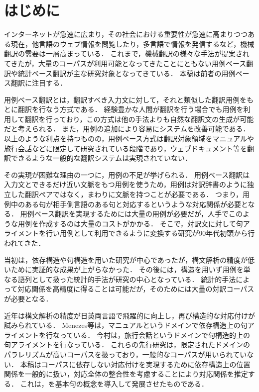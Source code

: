 \section{はじめに}
インターネットが急速に広まり，その社会における重要性が急速に高まりつつある現在，他言語のウェブ情報を閲覧したり，多言語で情報を発信するなど，機械翻訳の需要は一層高まっている．
これまで，機械翻訳の様々な手法が提案されてきたが，大量のコーパスが利用可能となってきたことにともない用例ベース翻訳\cite{Nagao1984}や統計ベース翻訳\cite{Brown1990}が主な研究対象となってきている．
本稿は前者の用例ベース翻訳に注目する．

用例ベース翻訳とは，翻訳すべき入力文に対して，それと類似した翻訳用例をもとに翻訳を行なう方式である．
経験豊かな人間が翻訳を行う場合でも用例を利用して翻訳を行っており，この方式は他の手法よりも自然な翻訳文の生成が可能だと考えられる．
また，用例の追加により容易にシステムを改善可能である．
以上のような利点を持つものの，用例ベース方式は翻訳対象領域をマニュアルや旅行会話などに限定して研究されている段階であり，ウェブドキュメント等を翻訳できるような一般的な翻訳システムは実現されていない．

その実現が困難な理由の一つに，用例の不足が挙げられる．
用例ベース翻訳は入力文とできるだけ近い文脈をもつ用例を使うため，用例は対訳辞書のように独立した翻訳ペアではなく，まわりに文脈を持つことが必要である．
つまり，用例中のある句が相手側言語のある句と対応するというような対応関係が必要となる．
用例ベース翻訳を実現するためには大量の用例が必要だが，人手でこのような用例を作成するのは大量のコストがかかる．
そこで，対訳文に対して句アライメントを行い用例として利用できるように変換する研究が90年代初頭から行われてきた．

当初は，依存構造や句構造を用いた研究が中心であったが\cite{Sadler1990,Matsumoto1993,Kaji1992}，構文解析の精度が低いために実証的な成果が上がらなかった．
その後には，構造を用いず用例を単なる語列として扱った統計的手法が研究の中心となっている\cite{北村1997,Sato2002}．
統計的手法によって対応関係を高精度に得ることは可能だが，そのためには大量の対訳コーパスが必要となる．

近年は構文解析の精度が日英両言語で飛躍的に向上し，再び構造的な対応付けが試みられている．
Menezes等\cite{Menezes2001}は，マニュアルというドメインで依存構造上の句アライメントを行なっている．
今村\cite{今村2002}は，旅行会話というドメインで句構造的上の句アライメントを行なっている．
これらの先行研究は，限定されたドメインのパラレリズムが高いコーパスを扱っており，一般的なコーパスが用いられていない．
本稿はコーパスに依存しない対応付けを実現するために依存構造上の位置関係を一般的に扱い，対応全体の整合性を考慮することにより対応関係を推定する．
これは，\cite{Watanabe2000}を基本句の概念を導入して発展させたものである．





